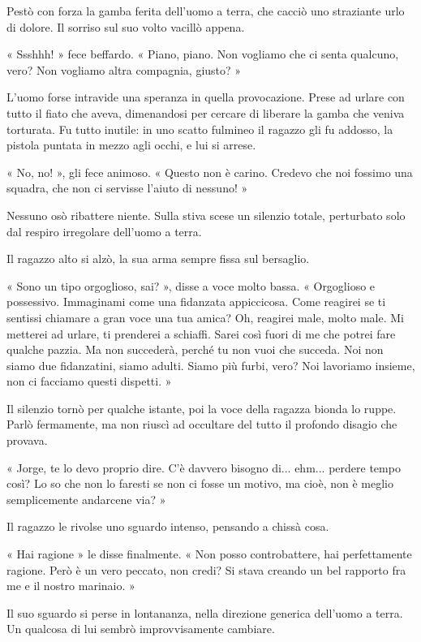 Pestò con forza la gamba ferita dell'uomo a terra, che cacciò uno straziante urlo di dolore. Il sorriso sul suo volto vacillò appena.

« Ssshhh! » fece beffardo. « Piano, piano. Non vogliamo che ci senta qualcuno, vero? Non vogliamo altra compagnia, giusto? »

L'uomo forse intravide una speranza in quella provocazione. Prese ad urlare con tutto il fiato che aveva, dimenandosi per cercare di liberare la gamba che veniva torturata. Fu tutto inutile: in uno scatto fulmineo il ragazzo gli fu addosso, la pistola puntata in mezzo agli occhi, e lui si arrese.

« No, no! », gli fece animoso. « Questo non è carino. Credevo che noi fossimo una squadra, che non ci servisse l'aiuto di nessuno! »

Nessuno osò ribattere niente. Sulla stiva scese un silenzio totale, perturbato solo dal respiro irregolare dell'uomo a terra.

Il ragazzo alto si alzò, la sua arma sempre fissa sul bersaglio.

« Sono un tipo orgoglioso, sai? », disse a voce molto bassa. « Orgoglioso e possessivo. Immaginami come una fidanzata appiccicosa. Come reagirei se ti sentissi chiamare a gran voce una tua amica? Oh, reagirei male, molto male. Mi metterei ad urlare, ti prenderei a schiaffi. Sarei così fuori di me che potrei fare qualche pazzia. Ma non succederà, perché tu non vuoi che succeda. Noi non siamo due fidanzatini, siamo adulti. Siamo più furbi, vero? Noi lavoriamo insieme, non ci facciamo questi dispetti. »

Il silenzio tornò per qualche istante, poi la voce della ragazza bionda lo ruppe. Parlò fermamente, ma non riuscì ad occultare del tutto il profondo disagio che provava.

« Jorge, te lo devo proprio dire. C'è davvero bisogno di... ehm... perdere tempo così? Lo so che non lo faresti se non ci fosse un motivo, ma cioè, non è meglio semplicemente andarcene via? »

Il ragazzo le rivolse uno sguardo intenso, pensando a chissà cosa.

« Hai ragione » le disse finalmente. « Non posso controbattere, hai perfettamente ragione. Però è un vero peccato, non credi? Si stava creando un bel rapporto fra me e il nostro marinaio. »

Il suo sguardo si perse in lontananza, nella direzione generica dell'uomo a terra. Un qualcosa di lui sembrò improvvisamente cambiare.

